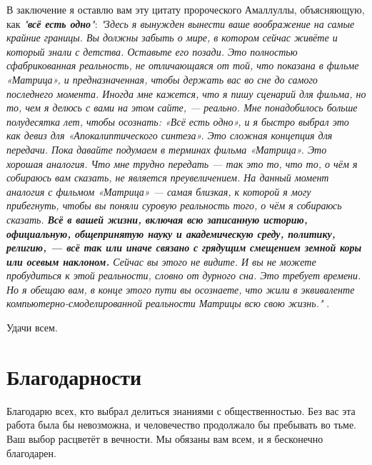 \documentclass[10pt,twocolumn,letterpaper]{article}
\begin{document}
В заключение я оставлю вам эту цитату пророческого Амаллуллы, объясняющую, как \textit{"\textbf{всё есть одно}"}: \textit{"Здесь я вынужден вынести ваше воображение на самые крайние границы. Вы должны забыть о мире, в котором сейчас живёте и который знали с детства. Оставьте его позади. Это полностью сфабрикованная реальность, не отличающаяся от той, что показана в фильме «Матрица», и предназначенная, чтобы держать вас во сне до самого последнего момента. Иногда мне кажется, что я пишу сценарий для фильма, но то, чем я делюсь с вами на этом сайте, — реально. Мне понадобилось больше полудесятка лет, чтобы осознать: «Всё есть одно», и я быстро выбрал это как девиз для «Апокалиптического синтеза». Это сложная концепция для передачи. Пока давайте подумаем в терминах фильма «Матрица». Это хорошая аналогия. Что мне трудно передать — так это то, что то, о чём я собираюсь вам сказать, не является преувеличением. На данный момент аналогия с фильмом «Матрица» — самая близкая, к которой я могу прибегнуть, чтобы вы поняли суровую реальность того, о чём я собираюсь сказать. \textbf{Всё в вашей жизни, включая всю записанную историю, официальную, общепринятую науку и академическую среду, политику, религию, — всё так или иначе связано с грядущим смещением земной коры или осевым наклоном.} Сейчас вы этого не видите. И вы не можете пробудиться к этой реальности, словно от дурного сна. Это требует времени. Но я обещаю вам, в конце этого пути вы осознаете, что жили в эквиваленте компьютерно-смоделированной реальности Матрицы всю свою жизнь."} \cite{33,34}.

Удачи всем.

\section{Благодарности}

Благодарю всех, кто выбрал делиться знаниями с общественностью. Без вас эта работа была бы невозможна, и человечество продолжало бы пребывать во тьме. Ваш выбор расцветёт в вечности. Мы обязаны вам всем, и я бесконечно благодарен.

\clearpage
\twocolumn

{\small
\renewcommand{\refname}{References}


}
\end{document}
